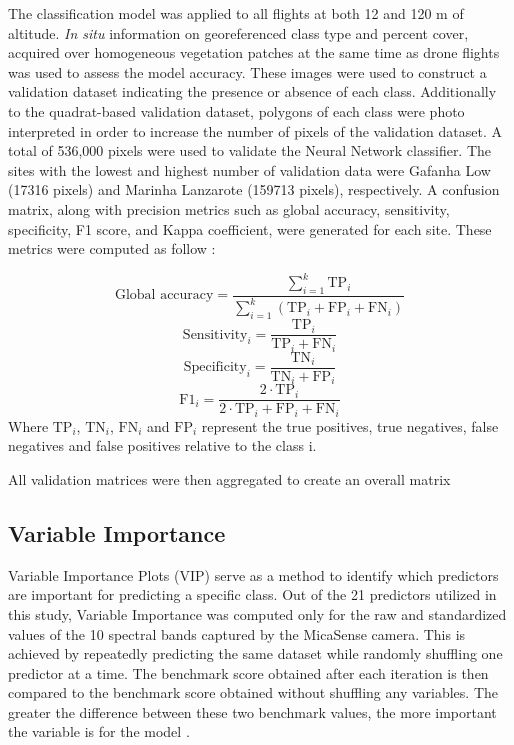 \documentclass[
  number]{elsarticle}
\begin{document}
The classification model was applied to all flights at both 12 and 120 m
of altitude. \emph{In situ} information on georeferenced class type and
percent cover, acquired over homogeneous vegetation patches at the same
time as drone flights was used to assess the model accuracy. These
images were used to construct a validation dataset indicating the
presence or absence of each class. Additionally to the quadrat-based
validation dataset, polygons of each class were photo interpreted in
order to increase the number of pixels of the validation dataset. A
total of 536,000 pixels were used to validate the Neural Network
classifier. The sites with the lowest and highest number of validation
data were Gafanha Low (17316 pixels) and Marinha Lanzarote (159713
pixels), respectively. A confusion matrix, along with precision metrics
such as global accuracy, sensitivity, specificity, F1 score, and Kappa
coefficient, were generated for each site. These metrics were computed
as follow :

\[
\text{Global accuracy} = \frac{\sum_{i=1}^{k} \text{TP}_i}{\sum_{i=1}^{k} \left(\text{TP}_i + \text{FP}_i + \text{FN}_i \right)}
\] \[
\text{Sensitivity}_i = \frac{\text{TP}_i}{\text{TP}_i + \text{FN}_i}
\] \[
\text{Specificity}_i = \frac{\text{TN}_i}{\text{TN}_i + \text{FP}_i}
\] \[
\text{F1}_i = \frac{2 \cdot \text{TP}_i}{2 \cdot \text{TP}_i + \text{FP}_i + \text{FN}_i}
\] Where \(\text{TP}_i\), \(\text{TN}_i\), \(\text{FN}_i\) and
\(\text{FP}_i\) represent the true positives, true negatives, false
negatives and false positives relative to the class i.

All validation matrices were then aggregated to create an overall matrix

\subsection{Variable Importance}\label{variable-importance}

Variable Importance Plots (VIP) serve as a method to identify which
predictors are important for predicting a specific class. Out of the 21
predictors utilized in this study, Variable Importance was computed only
for the raw and standardized values of the 10 spectral bands captured by
the MicaSense camera. This is achieved by repeatedly predicting the same
dataset while randomly shuffling one predictor at a time. The benchmark
score obtained after each iteration is then compared to the benchmark
score obtained without shuffling any variables. The greater the
difference between these two benchmark values, the more important the
variable is for the model \citep{WEI2015399}.
\end{document}
